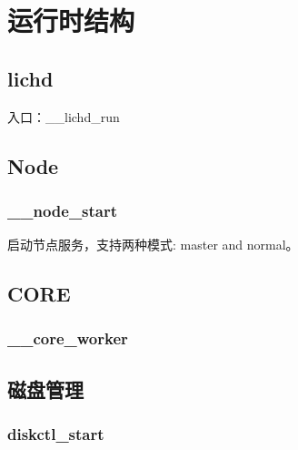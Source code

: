 \chapter{运行时结构}

\section{lichd}

入口：\_\_lichd\_run

\section{Node}

\subsection{\_\_node\_start}

启动节点服务，支持两种模式: master and normal。

\section{CORE}

\subsection{\_\_core\_worker}

\section{磁盘管理}

\subsection{diskctl\_start}
